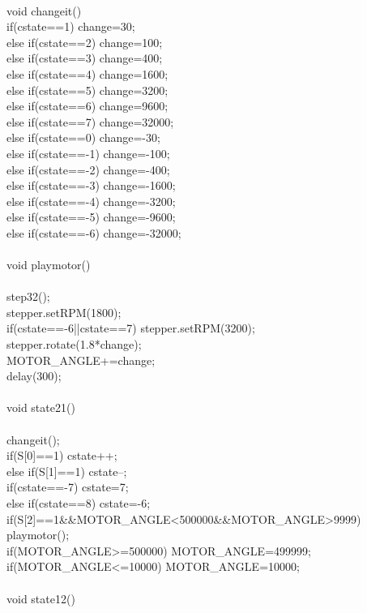 \begin{verbbox}
{{}\\
void changeit()\\
{
	if(cstate==1) change=30;\\
	else if(cstate==2) change=100;\\
	else if(cstate==3) change=400;\\
	else if(cstate==4) change=1600;\\
	else if(cstate==5) change=3200;\\
	else if(cstate==6) change=9600;\\
	else if(cstate==7) change=32000;\\
	else if(cstate==0) change=-30;\\
	else if(cstate==-1) change=-100;\\
	else if(cstate==-2) change=-400;\\
	else if(cstate==-3) change=-1600;\\
	else if(cstate==-4) change=-3200;\\
	else if(cstate==-5) change=-9600;\\
	else if(cstate==-6) change=-32000;\\
}\\
void playmotor()\\
{\\
	step32();\\
	stepper.setRPM(1800);\\
	if(cstate==-6||cstate==7) stepper.setRPM(3200);\\
	stepper.rotate(1.8*change);\\
	MOTOR\_ANGLE+=change;\\
	delay(300);\\
}\\
void state21()\\
{\\
	changeit();\\
	if(S[0]==1) cstate++;\\
	else if(S[1]==1) cstate--;\\
	if(cstate==-7) cstate=7;\\
	else if(cstate==8) cstate=-6;\\
	if(S[2]==1\&\&MOTOR\_ANGLE<500000\&\&MOTOR\_ANGLE>9999) playmotor();\\
	if(MOTOR\_ANGLE>=500000) MOTOR\_ANGLE=499999;\\
	if(MOTOR\_ANGLE<=10000) MOTOR\_ANGLE=10000;\\
}\\
void state12()\\
{\\
}}
\end{verbbox}
